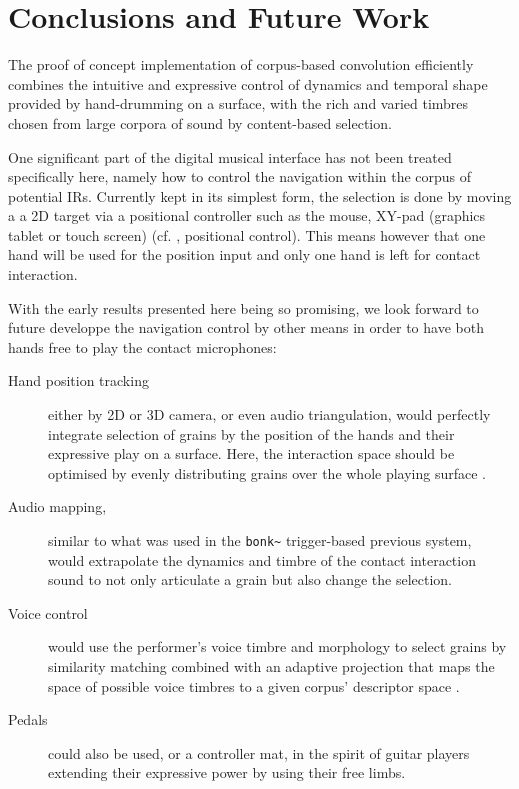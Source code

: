 \section{Conclusions and Future Work}\label{sec:future}

The proof of concept implementation of corpus-based convolution efficiently combines the intuitive and expressive control of dynamics and temporal shape provided by hand-drumming on a surface, with the rich and varied timbres chosen from large corpora of sound by content-based selection.


One significant part of the digital musical interface has not been treated specifically here, namely how to control the navigation within the corpus of potential IRs. Currently kept in its simplest form, the selection is done by moving a a 2D target via a positional controller such as the mouse, XY-pad (graphics tablet or touch screen) (cf. \cite{Schwarz-nime2012-sound-space}, positional control).
This means however that one hand will be used for the position input and only one hand is left for contact interaction.

With the early results presented here being so promising, we look forward to future developpe the navigation control by other means in order to have both hands free to play the contact microphones:

\begin{description}
\item[Hand position tracking] either by 2D or 3D camera, or even audio triangulation, would perfectly integrate selection of grains by the position of the hands and their expressive play on a surface.  Here, the interaction space should be optimised by evenly distributing grains over the whole playing surface \cite{LallemandSchwarz-dafx2011-distribute}.
\item[Audio mapping,] similar to what was used in the \verb|bonk~| trigger-based previous system, would extrapolate the dynamics and timbre of the contact interaction sound to not only articulate a grain but also change the selection.
\item[Voice control] would use the performer's voice timbre and morphology to select grains by similarity matching combined with an adaptive projection that maps the space of possible voice timbres to a given corpus' descriptor space \cite{StowellPlumbley-smc2010-timbre-remapping-regression-tree,Fasciani-si2013b}.
\item[Pedals] could also be used, or a controller mat, in the spirit of guitar players extending their expressive power by using their free limbs.
\end{description}

